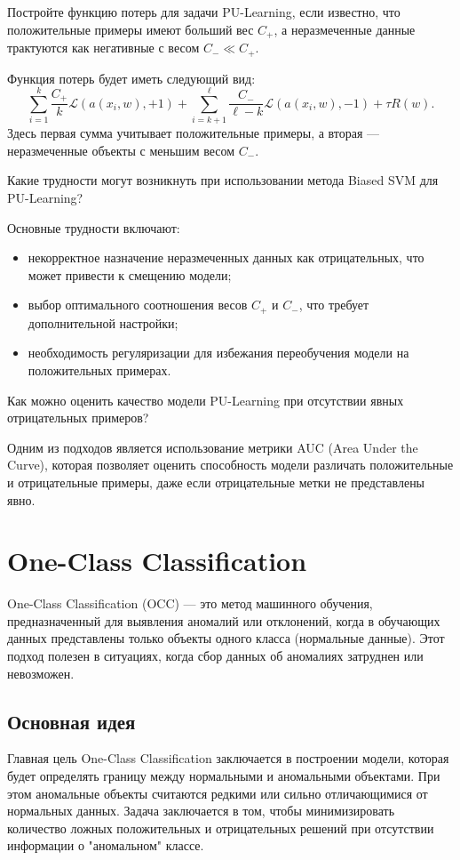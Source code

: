 \problem Постройте функцию потерь для задачи PU-Learning, если известно, что положительные примеры имеют больший вес \( C_+ \), а неразмеченные данные трактуются как негативные с весом \( C_- \ll C_+ \).

\solution Функция потерь будет иметь следующий вид:
\[
\sum_{i=1}^k \frac{C_+}{k} \mathcal{L}(a(x_i, w), +1) + \sum_{i=k+1}^\ell \frac{C_-}{\ell - k} \mathcal{L}(a(x_i, w), -1) + \tau R(w).
\]
Здесь первая сумма учитывает положительные примеры, а вторая — неразмеченные объекты с меньшим весом \( C_- \).

\problem Какие трудности могут возникнуть при использовании метода Biased SVM для PU-Learning?

\solution Основные трудности включают:
\begin{itemize}
    \item некорректное назначение неразмеченных данных как отрицательных, что может привести к смещению модели;
    \item выбор оптимального соотношения весов \( C_+ \) и \( C_- \), что требует дополнительной настройки;
    \item необходимость регуляризации для избежания переобучения модели на положительных примерах.
\end{itemize}

\problem Как можно оценить качество модели PU-Learning при отсутствии явных отрицательных примеров?

\solution Одним из подходов является использование метрики AUC (Area Under the Curve), которая позволяет оценить способность модели различать положительные и отрицательные примеры, даже если отрицательные метки не представлены явно.

\section{One-Class Classification}

One-Class Classification (OCC) — это метод машинного обучения, предназначенный для выявления аномалий или отклонений, когда в обучающих данных представлены только объекты одного класса (нормальные данные). Этот подход полезен в ситуациях, когда сбор данных об аномалиях затруднен или невозможен.

\subsection{Основная идея}

Главная цель One-Class Classification заключается в построении модели, которая будет определять границу между нормальными и аномальными объектами. При этом аномальные объекты считаются редкими или сильно отличающимися от нормальных данных. Задача заключается в том, чтобы минимизировать количество ложных положительных и отрицательных решений при отсутствии информации о "аномальном" классе.

